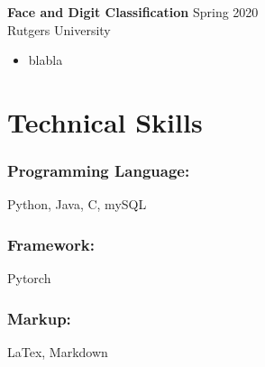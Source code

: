 \documentclass{article}
\begin{document}
\noindent \textbf{Face and Digit Classification}
\hfill{Spring 2020}\\
Rutgers University
\begin{itemize}
  \itemsep0em
  \item blabla
\end{itemize}

\section{Technical Skills}

\subsubsection{Programming Language:}

Python, Java, C, mySQL

\subsubsection{Framework:}

Pytorch

\subsubsection{Markup:}

LaTex, Markdown
\end{document}
